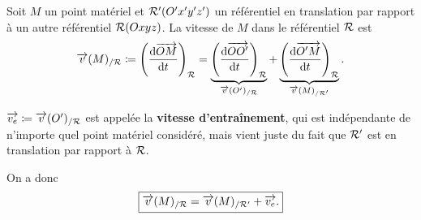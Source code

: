             Soit $M$ un point matériel et $\mathcal{R}'(O'x'y'z')$ un référentiel en translation par rapport à un autre référentiel $\mathcal{R}(Oxyz)$. La vitesse de $M$ dans le référentiel $\mathcal{R}$ est
            \begin{equation}
                \protect\overrightarrow{{v}}(M)_{/\mathcal{R}}\coloneqq\left(\frac{\mathrm{d}\protect\overrightarrow{{OM}}}{\mathrm{d} t}\right)_{\mathcal{R}}=\underbrace{\left(\frac{\mathrm{d} \protect\overrightarrow{{OO'}}}{\mathrm{d} t}\right)_{\mathcal{R}}}_{\protect\overrightarrow{{v}}(O')_{/\mathcal{R}}}+\underbrace{\left(\frac{\mathrm{d}\protect\overrightarrow{{O'M}}}{\mathrm{d} t}\right)_{\mathcal{R}}}_{\protect\overrightarrow{{v}}(M)_{/\mathcal{R}'}}.
            \end{equation}
            \begin{definition}
                $\protect\overrightarrow{{v_e}}\coloneqq\protect\overrightarrow{{v}}(O')_{/\mathcal{R}}$ est appelée la \textbf{vitesse d'entraînement}, qui est indépendante de n'importe quel point matériel considéré, mais vient juste du fait que $\mathcal{R}'$ est en translation par rapport à $\mathcal{R}$.
            \end{definition}
            On a donc
            \begin{equation}
                \boxed{
                    \protect\overrightarrow{{v}}(M)_{/\mathcal{R}}=\protect\overrightarrow{{v}}(M)_{/\mathcal{R}'}+\protect\overrightarrow{{v_e}}.
                }
            \end{equation}


